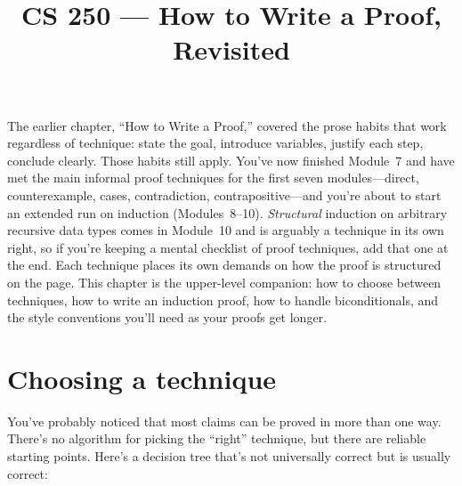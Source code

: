 \documentclass[11pt]{article}
\title{CS 250 --- How to Write a Proof, Revisited}
\author{}
\date{}
\begin{document}
\maketitle

The earlier chapter, ``How to Write a Proof,'' covered the prose habits that work regardless of technique: state the goal, introduce variables, justify each step, conclude clearly. Those habits still apply. You've now finished Module~7 and have met the main informal proof techniques for the first seven modules---direct, counterexample, cases, contradiction, contrapositive---and you're about to start an extended run on induction (Modules~8--10). \emph{Structural} induction on arbitrary recursive data types comes in Module~10 and is arguably a technique in its own right, so if you're keeping a mental checklist of proof techniques, add that one at the end. Each technique places its own demands on how the proof is structured on the page. This chapter is the upper-level companion: how to choose between techniques, how to write an induction proof, how to handle biconditionals, and the style conventions you'll need as your proofs get longer.

\section{Choosing a technique}

You've probably noticed that most claims can be proved in more than one way. There's no algorithm for picking the ``right'' technique, but there are reliable starting points. Here's a decision tree that's not universally correct but is usually correct:
\end{document}

